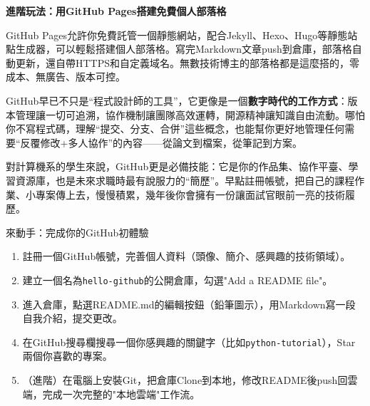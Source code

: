 \textbf{進階玩法：用GitHub Pages搭建免費個人部落格}\par

GitHub Pages允許你免費託管一個靜態網站，配合Jekyll、Hexo、Hugo等靜態站點生成器，可以輕鬆搭建個人部落格。寫完Markdown文章push到倉庫，部落格自動更新，還自帶HTTPS和自定義域名。無數技術博主的部落格都是這麼搭的，零成本、無廣告、版本可控。


GitHub早已不只是“程式設計師的工具”，它更像是一個\textbf{數字時代的工作方式}：版本管理讓一切可追溯，協作機制讓團隊高效運轉，開源精神讓知識自由流動。哪怕你不寫程式碼，理解“提交、分支、合併”這些概念，也能幫你更好地管理任何需要“反覆修改+多人協作”的內容——從論文到檔案，從筆記到方案。

對計算機系的學生來說，GitHub更是必備技能：它是你的作品集、協作平臺、學習資源庫，也是未來求職時最有說服力的“簡歷”。早點註冊帳號，把自己的課程作業、小專案傳上去，慢慢積累，幾年後你會擁有一份讓面試官眼前一亮的技術履歷。

\begin{tcbpractice}{來動手：完成你的GitHub初體驗}
\begin{enumerate}
  \item 註冊一個GitHub帳號，完善個人資料（頭像、簡介、感興趣的技術領域）。
  \item 建立一個名為\texttt{hello-\allowbreak github}的公開倉庫，勾選"Add a README file"。
  \item 進入倉庫，點選README.md的編輯按鈕（鉛筆圖示），用Markdown寫一段自我介紹，提交更改。
  \item 在GitHub搜尋欄搜尋一個你感興趣的關鍵字（比如\texttt{python-\allowbreak tutorial}），Star兩個你喜歡的專案。
  \item （進階）在電腦上安裝Git，把倉庫Clone到本地，修改README後push回雲端，完成一次完整的"本地雲端"工作流。
\end{enumerate}

\end{tcbpractice}
